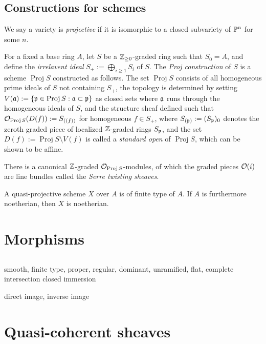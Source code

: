 \documentclass{../../large}
\newcommand{\Proj}{\operatorname{Proj}}
\begin{document}
\section{Constructions for schemes}



\begin{prb}
We say a variety is \emph{projective} if it is isomorphic to a closed subvariety of $\P^n$ for some $n$.

For a fixed a base ring $A$, let $S$ be a $\Z_{\ge0}$-graded ring such that $S_0=A$, and define the \emph{irrelavent ideal} $S_+:=\bigoplus_{i\ge1}S_i$ of $S$.
The \emph{Proj construction} of $S$ is a scheme $\Proj S$ constructed as follows.
The set $\Proj S$ consists of all homogeneous prime ideals of $S$ not containing $S_+$, the topology is determined by setting $V(\fa):=\{\fp\in\Proj S:\fa\subset\fp\}$ as closed sets where $\fa$ runs through the homogeneous ideals of $S$, and the structure sheaf defined such that $\cO_{\Proj S}(D(f)):=S_{((f))}$ for homogeneous $f\in S_+$, where $S_{(\fp)}:=(S_\fp)_0$ denotes the zeroth graded piece of localized $\Z$-graded rings $S_\fp$, and the set $D(f):=\Proj S\setminus V(f)$ is called a \emph{standard open} of $\Proj S$, which can be shown to be affine.

There is a canonical $\Z$-graded $\cO_{\Proj S}$-modules, of which the graded pieces $\cO(i)$ are line bundles called the \emph{Serre twisting sheaves}.
\end{prb}

A quasi-projective scheme $X$ over $A$ is of finite type of $A$.
If $A$ is furthermore noetherian, then $X$ is noetherian.





\chapter{Morphisms}

\section{}
smooth, finite type, proper, regular, dominant, unramified, flat, complete intersection
closed immersion


direct image, inverse image





\chapter{Quasi-coherent sheaves}
\end{document}
